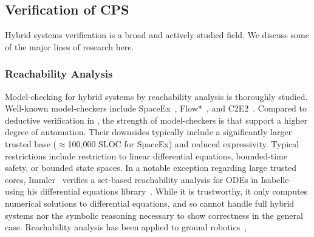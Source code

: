 \documentclass[12pt]{cmuthesis}
\theoremstyle{definition}
\theoremstyle{remark}
\begin{document}
%
\subsection{Verification of CPS}
%
Hybrid systems verification is a broad and actively studied field.
We discuss some of the major lines of research here.

%
%

\subsubsection{Reachability Analysis}
Model-checking for hybrid systems by reachability analysis is thoroughly studied.
Well-known model-checkers include SpaceEx~\cite{DBLP:conf/cav/FrehseGDCRLRGDM11}, Flow*~\cite{DBLP:conf/cav/ChenAS13}, and C2E2~\cite{DBLP:conf/tacas/DuggiralaMVP15}.
Compared to deductive verification in \dL, the strength of model-checkers is that support a higher degree of automation.
Their downsides typically include a significantly larger trusted base (${\approx}$100,000 SLOC for SpaceEx) and reduced expressivity.
Typical restrictions include restriction to linear differential equations, bounded-time safety, or bounded state spaces.
In a notable exception regarding large trusted cores, Immler~\cite{DBLP:conf/tacas/Immler15} verifies a set-based reachability analysis for ODEs in Isabelle using his differential equations library~\cite{DBLP:conf/itp/ImmlerT16}.
While it is trustworthy, it only computes numerical solutions to differential equations, and so cannot handle full hybrid systems nor the symbolic reasoning necessary to show correctness in the general case.
Reachability analysis has been applied to ground robotics~\cite{chen2015benchmark},
\end{document}
